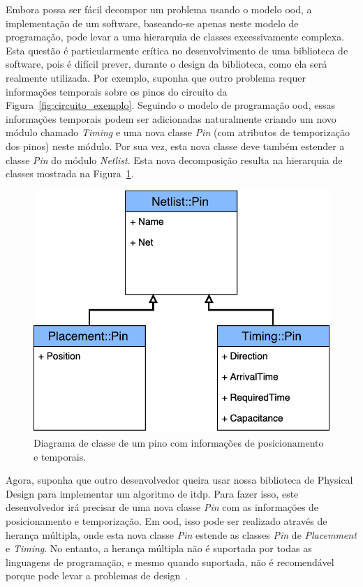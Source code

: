 Embora possa ser fácil decompor um problema usando o modelo \ac{ood}, a implementação de um software, baseando-se apenas neste modelo de programação, pode levar a uma hierarquia de classes excessivamente complexa.
Esta questão é particularmente crítica no desenvolvimento de uma biblioteca de software, pois é difícil prever, durante o design da biblioteca, como ela será realmente utilizada.
Por exemplo, suponha que outro problema requer informações temporais sobre os pinos do circuito da Figura~\ref{fig:circuito_exemplo}.
Seguindo o modelo de programação \ac{ood}, essas informações temporais podem ser adicionadas naturalmente criando um novo módulo chamado \textit{Timing} e uma nova classe \textit{Pin} (com atributos de temporização dos pinos) neste módulo.
Por sua vez, esta nova classe deve também estender a classe \textit{Pin} do módulo \textit{Netlist}.
Esta nova decomposição resulta na hierarquia de classes mostrada na Figura~\ref{fig:classHierarchyTimingOOD}.

\begin{figure}[ht]
    \centering
    \includegraphics[width=0.5\linewidth]{img/tecnica/classHierarchyTimingOOD}
    \caption[Diagrama de classe de um pino]{Diagrama de classe de um pino com informações de posicionamento e temporais.}
    \label{fig:classHierarchyTimingOOD}
\end{figure}


Agora, suponha que outro desenvolvedor queira usar nossa biblioteca de Physical Design para implementar um algoritmo de \ac{itdp}.
Para fazer isso, este desenvolvedor irá precisar de uma nova classe \textit{Pin} com as informações de posicionamento e temporização.
Em \ac{ood}, isso pode ser realizado através de herança múltipla, onde esta nova classe \textit{Pin} estende as classes \textit{Pin} de \textit{Placemment} e \textit{Timing}.
No entanto, a herança múltipla não é suportada por todas as linguagens de programação, e mesmo quando suportada, não é recomendável porque pode levar a problemas de design~\cite{nystrom2014game}.

